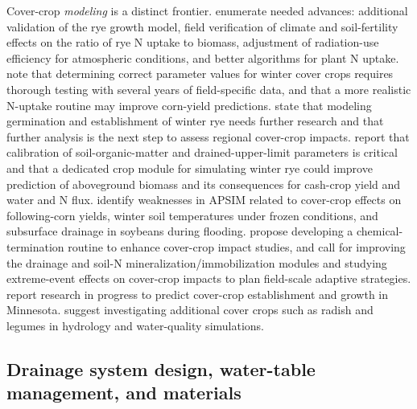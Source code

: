 \documentclass[11pt]{article}
\begin{document}
Cover-crop \emph{modeling} is a distinct frontier. \textcite{Feyereisen2006} enumerate needed advances: additional validation of the rye growth model, field verification of climate and soil-fertility effects on the ratio of rye N uptake to biomass, adjustment of radiation-use efficiency for atmospheric conditions, and better algorithms for plant N uptake. \textcite{Malone2007c} note that determining correct parameter values for winter cover crops requires thorough testing with several years of field-specific data, and that a more realistic N-uptake routine may improve corn-yield predictions. \textcite{Malone2014b} state that modeling germination and establishment of winter rye needs further research and that further analysis is the next step to assess regional cover-crop impacts. \textcite{Chatterjee2025} report that calibration of soil-organic-matter and drained-upper-limit parameters is critical and that a dedicated crop module for simulating winter rye could improve prediction of aboveground biomass and its consequences for cash-crop yield and water and N flux. \textcite{Dietzel2016} identify weaknesses in APSIM related to cover-crop effects on following-corn yields, winter soil temperatures under frozen conditions, and subsurface drainage in soybeans during flooding. \textcite{Gupta2022} propose developing a chemical-termination routine to enhance cover-crop impact studies, and \textcite{Gupta2023b} call for improving the drainage and soil-N mineralization/immobilization modules and studying extreme-event effects on cover-crop impacts to plan field-scale adaptive strategies. \textcite{Strock2004} report research in progress to predict cover-crop establishment and growth in Minnesota. \textcite{Singh2023} suggest investigating additional cover crops such as radish and legumes in hydrology and water-quality simulations.

\subsection{Drainage system design, water-table management, and materials}
\end{document}
